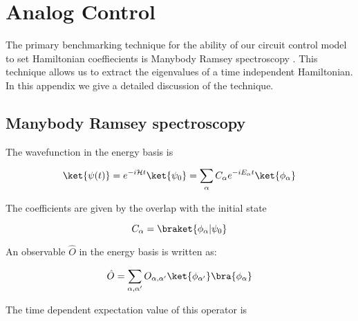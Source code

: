 \chapter[Analog Control]{Analog Control}
The primary benchmarking technique for the ability of our circuit control model to set Hamiltonian coeffiecients is Manybody Ramsey spectroscopy .
This technique allows us to extract the eigenvalues of a time independent Hamiltonian.
In this appendix we give a detailed discussion of the technique.

\section{Manybody Ramsey spectroscopy}


The wavefunction in the energy basis is

\begin{equation}
    \ket{\psi (t)} =e^{-i \mathcal{H} t} \ket{\psi_{0}} = \sum_{\alpha} C_{\alpha} e^{- i E_{\alpha} t} \ket{\phi_{\alpha}}
\end{equation}

The coefficients are given by the overlap with the initial state

\begin{equation}
    C_{\alpha} = \braket{\phi_{\alpha}|\psi_{0}}
\end{equation}

An observable $\hat{O}$ in the energy basis is written as:


\begin{equation}
    \hat{O} = \sum_{\alpha,\alpha^{\prime}} O_{\alpha,\alpha^{\prime}} \ket{\phi_{\alpha^{\prime}}} \bra{\phi_{\alpha}}
\end{equation}

The time dependent expectation value of this operator is


